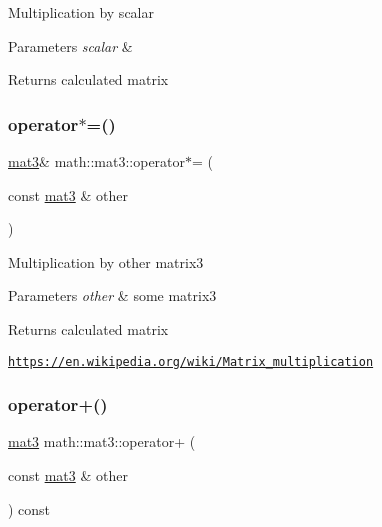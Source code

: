 Multiplication by scalar 
\begin{DoxyParams}{Parameters}
{\em scalar} & \\
\hline
\end{DoxyParams}
\begin{DoxyReturn}{Returns}
calculated matrix 
\end{DoxyReturn}
\mbox{\label{structmath_1_1mat3_ab1e15ead9ade7f9d51a5cec22a569df2}} 
\subsubsection{\texorpdfstring{operator$\ast$=()}{operator*=()}\hspace{0.1cm}{\footnotesize\ttfamily [2/2]}}
{\footnotesize\ttfamily \hyperlink{structmath_1_1mat3}{mat3}\& math\+::mat3\+::operator$\ast$= (\begin{DoxyParamCaption}\item[{const \hyperlink{structmath_1_1mat3}{mat3} \&}]{other }\end{DoxyParamCaption})\hspace{0.3cm}{\ttfamily [inline]}}

Multiplication by other matrix3 
\begin{DoxyParams}{Parameters}
{\em other} & some matrix3 \\
\hline
\end{DoxyParams}
\begin{DoxyReturn}{Returns}
calculated matrix
\end{DoxyReturn}
\href{https://en.wikipedia.org/wiki/Matrix_multiplication}{\tt https\+://en.\+wikipedia.\+org/wiki/\+Matrix\+\_\+multiplication} \mbox{\label{structmath_1_1mat3_a643b20e5dae6db81c2912901b02b055a}} 
\subsubsection{\texorpdfstring{operator+()}{operator+()}}
{\footnotesize\ttfamily \hyperlink{structmath_1_1mat3}{mat3} math\+::mat3\+::operator+ (\begin{DoxyParamCaption}\item[{const \hyperlink{structmath_1_1mat3}{mat3} \&}]{other }\end{DoxyParamCaption}) const\hspace{0.3cm}{\ttfamily [inline]}}


